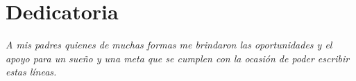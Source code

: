 \thispagestyle{plain}
\chapter*{Dedicatoria}
\begin{flushright}
\textit{A mis padres quienes de muchas formas me brindaron las oportunidades y el apoyo para un sueño y una meta que se cumplen con la ocasión de poder escribir estas líneas.}
\end{flushright}